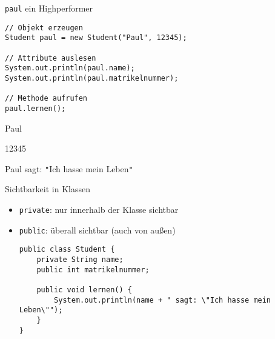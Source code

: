 \documentclass{../../presentation}
\begin{document}
\begin{frame}[fragile]{\texttt{paul} ein Highperformer}
	\begin{verbatim}
// Objekt erzeugen
Student paul = new Student("Paul", 12345);

// Attribute auslesen
System.out.println(paul.name);
System.out.println(paul.matrikelnummer);

// Methode aufrufen
paul.lernen();
\end{verbatim}

	\begin{ausgabe}
		Paul

		12345

		Paul sagt: \texttt{"}Ich hasse mein Leben\texttt{"}
	\end{ausgabe}
\end{frame}



\begin{frame}[fragile]{Sichtbarkeit in Klassen}

	\begin{itemize}
		\item<2-> \texttt{private}: nur innerhalb der Klasse sichtbar
		\item<3-> \texttt{public}: überall sichtbar (auch von außen)
		      \begin{verbatim}
public class Student {
    private String name;         
    public int matrikelnummer;   

    public void lernen() {
        System.out.println(name + " sagt: \"Ich hasse mein Leben\"");
    }
}
\end{verbatim}
	\end{itemize}
\end{frame}
\end{document}
